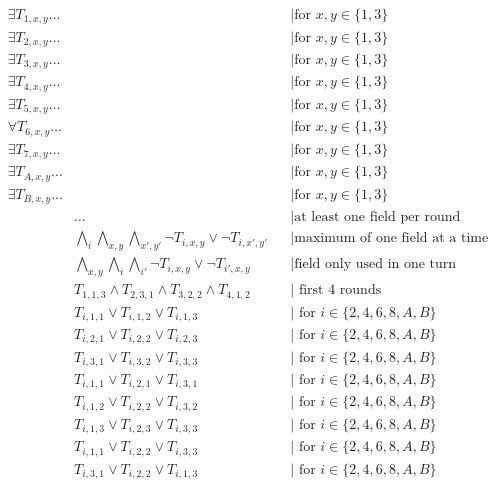 \documentclass{base}
\begin{document}
\begin{align*}
    \exists T_{1,x,y}\dots & &&\text{|for $x,y \in \{1,3\}$}\\
    \exists T_{2,x,y}\dots & &&\text{|for $x,y \in \{1,3\}$}\\
    \exists T_{3,x,y}\dots & &&\text{|for $x,y \in \{1,3\}$}\\
    \exists T_{4,x,y}\dots & &&\text{|for $x,y \in \{1,3\}$}\\
    \exists T_{5,x,y}\dots & &&\text{|for $x,y \in \{1,3\}$}\\
    \forall T_{6,x,y}\dots & &&\text{|for $x,y \in \{1,3\}$}\\
    \exists T_{7,x,y}\dots & &&\text{|for $x,y \in \{1,3\}$}\\
    \exists T_{A,x,y}\dots & &&\text{|for $x,y \in \{1,3\}$}\\
    \exists T_{B,x,y}\dots & &&\text{|for $x,y \in \{1,3\}$}\\
    &\dots && \text{|at least one field per round} \\
    &\bigwedge_{i} \bigwedge_{x,y} \bigwedge_{x',y'} \neg T_{i,x,y} \lor \neg T_{i,x',y'} && \text{|maximum of one field at a time} \\
    &\bigwedge_{x,y} \bigwedge_{i} \bigwedge_{i'} \neg T_{i,x,y} \lor \neg T_{i',x,y} && \text{|field only used in one turn} \\
    &T_{1,1,3} \land T_{2,3,1} \land T_{3,2,2} \land T_{4,1,2} && \text{| first 4 rounds} \\
    &T_{i,1,1} \lor T_{i,1,2} \lor T_{i,1,3} && \text{| for $i \in \{2,4,6,8,A,B\}$} \\
    &T_{i,2,1} \lor T_{i,2,2} \lor T_{i,2,3} && \text{| for $i \in \{2,4,6,8,A,B\}$} \\
    &T_{i,3,1} \lor T_{i,3,2} \lor T_{i,3,3} && \text{| for $i \in \{2,4,6,8,A,B\}$} \\
    &T_{i,1,1} \lor T_{i,2,1} \lor T_{i,3,1} && \text{| for $i \in \{2,4,6,8,A,B\}$} \\
    &T_{i,1,2} \lor T_{i,2,2} \lor T_{i,3,2} && \text{| for $i \in \{2,4,6,8,A,B\}$} \\
    &T_{i,1,3} \lor T_{i,2,3} \lor T_{i,3,3} && \text{| for $i \in \{2,4,6,8,A,B\}$} \\
    &T_{i,1,1} \lor T_{i,2,2} \lor T_{i,3,3} && \text{| for $i \in \{2,4,6,8,A,B\}$} \\
    &T_{i,3,1} \lor T_{i,2,2} \lor T_{i,1,3} && \text{| for $i \in \{2,4,6,8,A,B\}$} \\
\end{align*}
\end{document}
